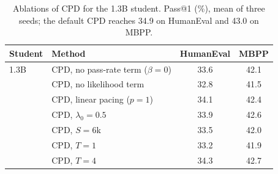 \documentclass{article} %
\begin{document}
\begin{table}[h]
\caption{Ablations of CPD for the 1.3B student. Pass@1 (\%), mean of three seeds; the default CPD reaches 34.9 on HumanEval and 43.0 on MBPP.}
\label{tab:ablation}
\centering
\begin{tabular}{llcc}
\toprule
Student & Method & HumanEval & MBPP \\
\midrule
1.3B & CPD, no pass-rate term ($\beta = 0$) & 33.6 & 42.1 \\
 & CPD, no likelihood term & 32.8 & 41.5 \\
 & CPD, linear pacing ($p = 1$) & 34.1 & 42.4 \\
 & CPD, $\lambda_0 = 0.5$ & 33.9 & 42.6 \\
 & CPD, $S = 6$k & 33.5 & 42.0 \\
 & CPD, $T = 1$ & 33.2 & 41.9 \\
 & CPD, $T = 4$ & 34.3 & 42.7 \\
\bottomrule
\end{tabular}
\end{table} %
\end{document}
